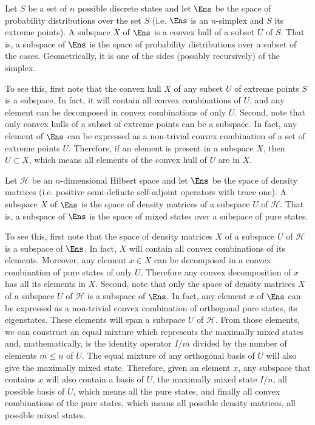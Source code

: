 \begin{example}
	Let $S$ be a set of $n$ possible discrete states and let $\Ens$ be the space of probability distributions over the set $S$ (i.e. $\Ens$ is an $n$-simplex and $S$ its extreme points). A subspace $X$ of $\Ens$ is a convex hull of a subset $U$ of $S$. That is, a subspace of $\Ens$ is the space of probability distributions over a subset of the cases. Geometrically, it is one of the sides (possibly recursively) of the simplex.
	
	To see this, first note that the convex hull $X$ of any subset $U$ of extreme points $S$ is a subspace. In fact, it will contain all convex combinations of $U$, and any element can be decomposed in convex combinations of only $U$. Second, note that only convex hulls of a subset of extreme points can be a subspace. In fact, any element of $\Ens$ can be expressed as a non-trivial convex combination of a set of extreme points $U$. Therefore, if an element is present in a subspace $X$, then $U \subset X$, which means all elements of the convex hull of $U$ are in $X$.
\end{example}

\begin{example}
	Let $\mathcal{H}$ be an $n$-dimensional Hilbert space and let $\Ens$ be the space of density matrices (i.e. positive semi-definite self-adjoint operators with trace one). A subspace $X$ of $\Ens$ is the space of density matrices of a subspace $U$ of $\mathcal{H}$. That is, a subspace of $\Ens$ is the space of mixed states over a subspace of pure states.
	
	To see this, first note that the space of density matrices $X$ of a subspace $U$ of $\mathcal{H}$ is a subspace of $\Ens$. In fact, $X$ will contain all convex combinations of its elements. Moreover, any element $x \in X$ can be decomposed in a convex combination of pure states of only $U$. Therefore any convex decomposition of $x$ has all its elements in $X$. Second, note that only the space of density matrices $X$ of a subspace $U$ of $\mathcal{H}$ is a subspace of $\Ens$. In fact, any element $x$ of $\Ens$ can be expressed as a non-trivial convex combination of orthogonal pure states, its eigenstates. These elements will span a subspace $U$ of $\mathcal{H}$. From those elements, we can construct an equal mixture which represents the maximally mixed states and, mathematically, is the identity operator $I/m$ divided by the number of elements $m \leq n$ of $U$. The equal mixture of any orthogonal basis of $U$ will also give the maximally mixed state. Therefore, given an element $x$, any subspace that contains $x$ will also contain a basis of $U$, the maximally mixed state $I/n$, all possible basis of $U$, which means all the pure states, and finally all convex combinations of the pure states, which means all possible density matrices, all possible mixed states.
\end{example}

